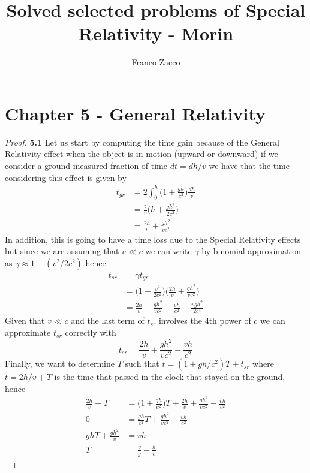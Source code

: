 \documentclass[11pt]{article}
\title{\textbf{Solved selected problems of Special Relativity - Morin}}
\author{Franco Zacco}
\date{}
\theoremstyle{definition}
\begin{document}
\maketitle
\thispagestyle{empty}

\section*{Chapter 5 - General Relativity}

\begin{proof}{\textbf{5.1}}
    Let us start by computing the time gain because of the General Relativity
    effect when the object is in motion (upward or downward) if we consider a
    ground-measured fraction of time $dt = dh/v$ we have that the time
    considering this effect is given by   
    \begin{align*}
        t_{gr} &= 2\int_0^h \Bigg(1 + \frac{gh}{c^2}\bigg)\frac{dh}{v}\\
        &= \frac{2}{v} \bigg(h + \frac{gh^2}{2c^2}\bigg) \\
        &= \frac{2h}{v} + \frac{gh^2}{vc^2}
    \end{align*}
    In addition, this is going to have a time loss due to the Special Relativity
    effects but since we are assuming that $v \ll c$ we can write $\gamma$ 
    by binomial approximation as $\gamma \approx 1 - (v^2/2c^2)$ hence
    \begin{align*}
        t_{sr} &= \gamma t_{gr}\\
        &= \bigg(1 - \frac{v^2}{2c^2}\bigg)
        \bigg(\frac{2h}{v} + \frac{gh^2}{vc^2}\bigg)\\
        &= \frac{2h}{v} + \frac{gh^2}{vc^2} - \frac{vh}{c^2} - \frac{vgh^2}{2c^4}
    \end{align*}
    Given that $v \ll c$ and the last term of $t_{sr}$ involves the 4th power
    of $c$ we can approximate $t_{sr}$ correctly with
    $$t_{sr}  = \frac{2h}{v} + \frac{gh^2}{vc^2} - \frac{vh}{c^2}$$
    Finally, we want to determine $T$ such that $t = (1 + gh/c^2)T + t_{sr}$
    where $t = 2h/v + T$ is the time that passed in the clock that stayed on 
    the ground, hence
    \begin{align*}
        \frac{2h}{v} + T &= \bigg(1 + \frac{gh}{c^2}\bigg)T
        + \frac{2h}{v} + \frac{gh^2}{vc^2} - \frac{vh}{c^2}\\
        0 &= \frac{gh}{c^2}T + \frac{gh^2}{vc^2} - \frac{vh}{c^2}\\
        ghT + \frac{gh^2}{v} &= vh\\
        T &= \frac{v}{g} - \frac{h}{v}
    \end{align*}

\end{proof}
\end{document}
